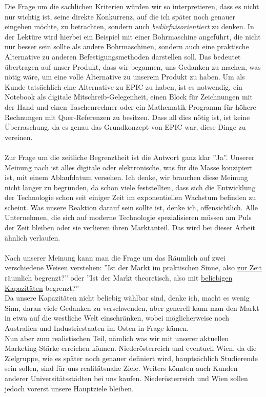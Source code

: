Die Frage um die sachlichen Kriterien würden wir so interpretieren, dass es nicht nur wichtig ist, seine direkte Konkurrenz, auf die ich später noch genauer eingehen möchte, zu betrachten, sondern auch \textit{bedürfnisorientiert} zu denken. In der Lektüre wird hierbei ein Beispiel mit einer Bohrmaschine angeführt, die nicht nur besser sein sollte als andere Bohrmaschinen, sondern auch eine praktische Alternative zu anderen Befestigungsmethoden darstellen soll. Das bedeutet übertragen auf unser Produkt, dass wir begannen, uns Gedanken zu machen, was nötig wäre, um eine volle Alternative zu unserem Produkt zu haben. Um als Kunde tatsächlich eine Alternative zu EPIC zu haben, ist es notwendig, ein Notebook als digitale Mitschreib-Gelegenheit, einen Block für Zeichnungen mit der Hand und einen Taschenrechner oder ein Mathematik-Programm für höhere Rechnungen mit Quer-Referenzen zu besitzen. Dass all dies nötig ist, ist keine Überraschung, da es genau das Grundkonzept von EPIC war, diese Dinge zu vereinen. \\
\\
Zur Frage um die zeitliche Begrenztheit ist die Antwort ganz klar ''Ja''. Unserer Meinung nach ist alles digitale oder elektronische, was für die Masse konzipiert ist, mit einem Ablaufdatum versehen. Ich denke, wir brauchen diese Meinung nicht länger zu begründen, da schon viele feststellten, dass sich die Entwicklung der Technologie schon seit einiger Zeit im exponentiellen Wachstum befinden zu scheint. Was unsere Reaktion darauf sein sollte ist, denke ich, offensichtlich. Alle Unternehmen, die sich auf moderne Technologie spezialisieren müssen am Puls der Zeit bleiben oder sie verlieren ihren Marktanteil. Das wird bei dieser Arbeit ähnlich verlaufen.\\
\\
Nach unserer Meinung kann man die Frage um das Räumlich auf zwei verschiedene Weisen verstehen: ''Ist der Markt im praktischen Sinne, also \underline{zur Zeit} räumlich begrenzt?'' oder ''Ist der Markt theoretisch, also mit \underline{beliebigen Kapazitäten} begrenzt?''\\
Da unsere Kapazitäten nicht beliebig wählbar sind, denke ich, macht es wenig Sinn, daran viele Gedanken zu verschwenden, aber generell kann man den Markt in etwa auf die westliche Welt einschränken, wobei möglicherweise noch Australien und Industriestaaten im Osten in Frage kämen.\\
Nun aber zum realistischen Teil, nämlich was wir mit unserer aktuellen Marketing-Stärke erreichen können. Niederösterreich und eventuell Wien, da die Zielgruppe, wie es später noch genauer definiert wird, hauptsächlich Studierende sein sollen, sind für uns realitätsnahe Ziele. Weiters könnten auch Kunden anderer Universitätsstädten bei uns kaufen. Niederösterreich und Wien sollen jedoch vorerst unsere Hauptziele bleiben.\\

